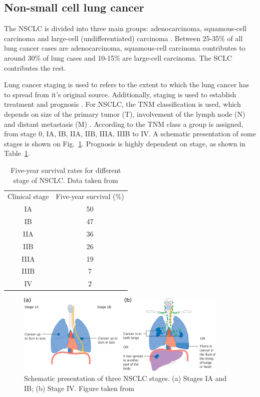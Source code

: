 \subsection{Non-small cell lung cancer}

The NSCLC is divided into three main groups: adenocarcinoma, squamous-cell carcinoma and large-cell (undifferentiated) carcinoma \cite{Kasper2015}.
Between 25-35\% of all lung cancer cases are adenocarcinoma, squamous-cell carcinoma contributes to around 30\% of lung cases and 10-15\% are large-cell carcinoma. The SCLC contributes the rest. 

Lung cancer staging is used to refers to the extent to which the lung cancer has to spread from it's original source. Additionally, staging is used to establish treatment and prognosis \cite{Chheang2013}. For NSCLC, the TNM classification is used, which depends on
size of the primary tumor (T), involvement of the lymph node (N) and distant metastasis (M) \cite{Kasper2015}. According to the TNM class a group is assigned, from stage 0, IA, IB, IIA, IIB, IIIA, IIIB to IV. 
A schematic presentation of some stages is shown on Fig.~\ref{Fig:Stages}. Prognosis is highly dependent on stage, as shown in Table~\ref{tab:prognosis}.

\begin{table}[H]
  \centering
  \caption{Five-year survival rates for different stage of NSCLC. Data taken from \cite{Rami2009}}
  \begin{tabular}{|c|c|}
   \hline
   \hline
Clinical stage & Five-year survival (\%) \\
IA & 50 \\
IB & 47 \\
IIA & 36 \\
IIB & 26 \\
IIIA & 19 \\
IIIB & 7 \\
IV & 2 \\
\hline
\hline
  \end{tabular}
  \label{tab:prognosis}
\end{table}

\begin{figure}[H]
\begin{center}
\includegraphics[width=0.9\textwidth]{./Fundamentals/Images/Stages.png}
\caption{Schematic presentation of three NSCLC stages. (a) Stages IA and IB; (b) Stage IV. Figure taken from \cite{CancerStage}}
\label{Fig:Stages}
\end{center}
\end{figure}

